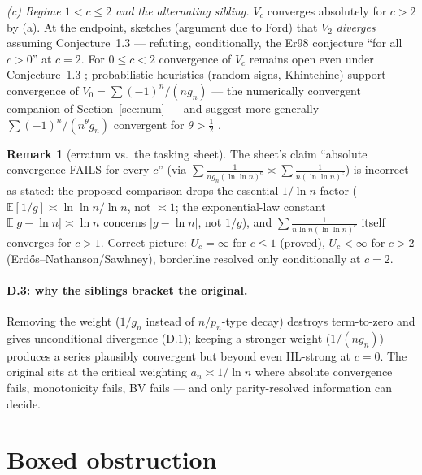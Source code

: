 \documentclass[11pt]{article}
\theoremstyle{definition}
\newtheorem{remark}[theorem]{Remark}
\begin{document}
\emph{(c) Regime $1<c\le2$ and the alternating sibling.} $V_c$ converges absolutely for $c>2$ by (a). At the endpoint, \cite[\S5]{Ta23} sketches (argument due to Ford) that $V_2$ \emph{diverges} assuming Conjecture~1.3 --- refuting, conditionally, the Er98 conjecture ``for all $c>0$'' at $c=2$. For $0\le c<2$ convergence of $V_c$ remains open even under Conjecture~1.3 \cite{Ta23}; probabilistic heuristics (random signs, Khintchine) support convergence of $V_0=\sum(-1)^n/(ng_n)$ --- the numerically convergent companion of Section~\ref{sec:num} --- and suggest more generally $\sum(-1)^n/(n^\theta g_n)$ convergent for $\theta>\tfrac12$ \cite{Ta23}.

\begin{remark}[erratum vs.\ the tasking sheet]
The sheet's claim ``absolute convergence FAILS for every $c$'' (via $\sum\frac{1}{ng_n(\ln\ln n)^c}\asymp\sum\frac{1}{n(\ln\ln n)^c}$) is incorrect as stated: the proposed comparison drops the essential $1/\ln n$ factor ($\mathbb E[1/g]\asymp\ln\ln n/\ln n$, not $\asymp1$; the exponential-law constant $\mathbb E|g-\ln n|\asymp\ln n$ concerns $|g-\ln n|$, not $1/g$), and $\sum\frac{1}{n\ln n(\ln\ln n)^c}$ itself converges for $c>1$. Correct picture: $U_c=\infty$ for $c\le1$ (proved), $U_c<\infty$ for $c>2$ (Erd\H{o}s--Nathanson/Sawhney), borderline resolved only conditionally at $c=2$.
\end{remark}

\paragraph{D.3: why the siblings bracket the original.}
Removing the weight ($1/g_n$ instead of $n/p_n$-type decay) destroys term-to-zero and gives unconditional divergence (D.1); keeping a stronger weight ($1/(ng_n)$) produces a series plausibly convergent but beyond even HL-strong at $c=0$. The original sits at the critical weighting $a_n\asymp1/\ln n$ where absolute convergence fails, monotonicity fails, BV fails --- and only parity-resolved information can decide.

\section{Boxed obstruction}\label{sec:obs}
\end{document}
